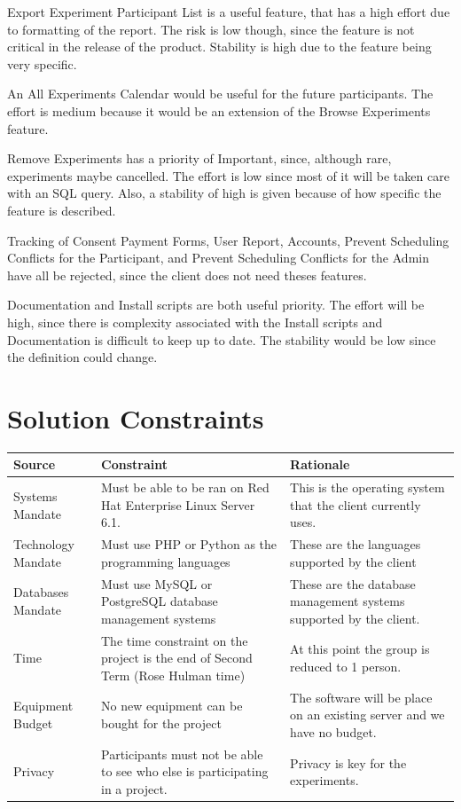 Export Experiment Participant List is a useful feature, that has a high effort due to formatting of the report.  The risk is low though, since the feature is not critical in the release of the product.  Stability is high due to the feature being very specific.

An All Experiments Calendar would be useful for the future participants.  The effort is medium because it would be an extension of the Browse Experiments feature.

Remove Experiments has a priority of Important, since, although rare, experiments maybe cancelled. The effort is low since most of it will be taken care with an SQL query.  Also, a stability of high is given because of  how specific the feature is described.

Tracking of Consent Payment Forms, User Report, Accounts, Prevent Scheduling Conflicts for the Participant, and Prevent Scheduling Conflicts for the Admin have all be rejected, since the client does not need theses features.

Documentation and Install scripts are both useful priority.  The effort will be high, since there is complexity associated with the Install scripts and Documentation is difficult to keep up to date.  The stability would be low since the definition could change.

\clearpage
\section{Solution Constraints}
\begin{table}[!h]
    \begin{tabular}{|l|p{5.5cm}|p{5.5cm}|}
        \hline
        Source & Constraint & Rationale \\
        \hline
        Systems Mandate & Must be able to be ran on Red Hat Enterprise Linux Server 6.1. & This is the operating system that the client currently uses. \\
        \hline
        Technology Mandate & Must use PHP or Python as the programming languages & These are the languages supported by the client \\
        \hline
        Databases Mandate & Must use MySQL or PostgreSQL database management systems & These are the database management systems supported by the client. \\
        \hline
        Time  & The time constraint on the project is the end of Second Term (Rose Hulman time) & At this point the group is reduced to 1 person. \\
        \hline
        Equipment Budget & No new equipment can be bought for the project & The software will be place on an existing server and we have no budget. \\
        \hline
        Privacy & Participants must not be able to see who else is participating in a project. & Privacy is key for the experiments. \\
        \hline
    \end{tabular}
\end{table}

